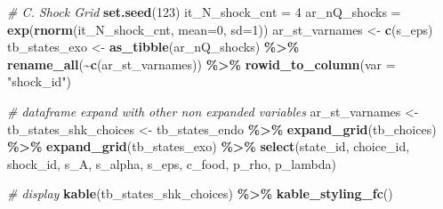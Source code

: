\documentclass[
]{book}
\newenvironment{Shaded}{\begin{snugshade}}{\end{snugshade}}
\newcommand{\CommentTok}[1]{\textcolor[rgb]{0.56,0.35,0.01}{\textit{#1}}}
\newcommand{\DataTypeTok}[1]{\textcolor[rgb]{0.13,0.29,0.53}{#1}}
\newcommand{\DecValTok}[1]{\textcolor[rgb]{0.00,0.00,0.81}{#1}}
\newcommand{\KeywordTok}[1]{\textcolor[rgb]{0.13,0.29,0.53}{\textbf{#1}}}
\newcommand{\NormalTok}[1]{#1}
\newcommand{\OperatorTok}[1]{\textcolor[rgb]{0.81,0.36,0.00}{\textbf{#1}}}
\newcommand{\StringTok}[1]{\textcolor[rgb]{0.31,0.60,0.02}{#1}}
\begin{document}
\begin{Shaded}
\begin{Highlighting}[]
\CommentTok{\# C. Shock Grid}
\KeywordTok{set.seed}\NormalTok{(}\DecValTok{123}\NormalTok{)}
\NormalTok{it\_N\_shock\_cnt =}\StringTok{ }\DecValTok{4}
\NormalTok{ar\_nQ\_shocks =}\StringTok{ }\KeywordTok{exp}\NormalTok{(}\KeywordTok{rnorm}\NormalTok{(it\_N\_shock\_cnt, }\DataTypeTok{mean=}\DecValTok{0}\NormalTok{, }\DataTypeTok{sd=}\DecValTok{1}\NormalTok{))}
\NormalTok{ar\_st\_varnames \textless{}{-}}\StringTok{ }\KeywordTok{c}\NormalTok{(}\StringTok{\textquotesingle{}s\_eps\textquotesingle{}}\NormalTok{)}
\NormalTok{tb\_states\_exo \textless{}{-}}\StringTok{ }\KeywordTok{as\_tibble}\NormalTok{(ar\_nQ\_shocks) }\OperatorTok{\%\textgreater{}\%}
\StringTok{  }\KeywordTok{rename\_all}\NormalTok{(}\OperatorTok{\textasciitilde{}}\KeywordTok{c}\NormalTok{(ar\_st\_varnames)) }\OperatorTok{\%\textgreater{}\%}
\StringTok{  }\KeywordTok{rowid\_to\_column}\NormalTok{(}\DataTypeTok{var =} \StringTok{"shock\_id"}\NormalTok{)}

\CommentTok{\# dataframe expand with other non expanded variables}
\NormalTok{ar\_st\_varnames \textless{}{-}}
\NormalTok{tb\_states\_shk\_choices \textless{}{-}}\StringTok{ }\NormalTok{tb\_states\_endo }\OperatorTok{\%\textgreater{}\%}
\StringTok{  }\KeywordTok{expand\_grid}\NormalTok{(tb\_choices) }\OperatorTok{\%\textgreater{}\%}
\StringTok{  }\KeywordTok{expand\_grid}\NormalTok{(tb\_states\_exo) }\OperatorTok{\%\textgreater{}\%}
\StringTok{  }\KeywordTok{select}\NormalTok{(state\_id, choice\_id, shock\_id,}
\NormalTok{         s\_A, s\_alpha, s\_eps, c\_food,}
\NormalTok{         p\_rho, p\_lambda)}

\CommentTok{\# display}
\KeywordTok{kable}\NormalTok{(tb\_states\_shk\_choices) }\OperatorTok{\%\textgreater{}\%}\StringTok{ }\KeywordTok{kable\_styling\_fc}\NormalTok{()}
\end{Highlighting}
\end{Shaded}
\end{document}
